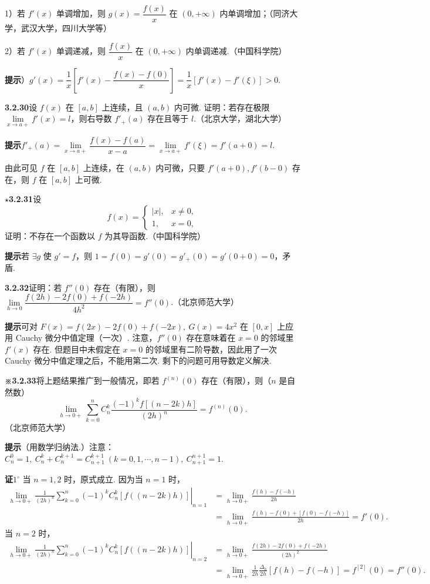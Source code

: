 \documentclass[UTF8,12pt,a4paper,fontset=fandol]{ctexart}
\begin{document}
1）若 $f'(x)$ 单调增加，则 $g(x)=\dfrac{f(x)}x$ 在 $(0,+\infty)$ 内单调增加；（同济大学，武汉大学，四川大学等）

2）若 $f'(x)$ 单调递减，则 $\dfrac{f(x)}x$ 在 $(0,+\infty)$ 内单调递减.（中国科学院）

\noindent\textbf{提示}）$g'(x)=\dfrac1x\left[f'(x)-\dfrac{f(x)-f(0)}x\right]=\dfrac1x[f'(x)-f'(\xi)]>0$.

\noindent\textbf{3.2.30}\quad 设 $f(x)$ 在 $[a,b]$ 上连续，且 $(a,b)$ 内可微. 证明：若存在极限 $\lim\limits_{x\to a+}f'(x)=l$，则右导数 $f'_+(a)$ 存在且等于 $l$.（北京大学，湖北大学）

\noindent\textbf{提示}\quad $f'_+(a)=\lim\limits_{x\to a+}\dfrac{f(x)-f(a)}{x-a}=\lim\limits_{x\to a+}f'(\xi)=f'(a+0)=l$.

由此可见 $f$ 在 $[a,b]$ 上连续，在 $(a,b)$ 内可微，只要 $f'(a+0),f'(b-0)$ 存在，则 $f$ 在 $[a,b]$ 上可微.

\noindent\textbf{$\star$3.2.31}\quad 设
\[
  f(x)=
  \begin{cases}
    |x|,& x\ne0,\\
    1,& x=0,
  \end{cases}
\]
证明：不存在一个函数以 $f$ 为其导函数.（中国科学院）

\noindent\textbf{提示}\quad 若 $\exists g$ 使 $g'=f$，则 $1=f(0)=g'(0)=g'_+(0)=g'(0+0)=0$，矛盾.

\noindent\textbf{3.2.32}\quad 证明：若 $f''(0)$ 存在（有限），则 $\lim\limits_{h\to0}\dfrac{f(2h)-2f(0)+f(-2h)}{4h^2}=f''(0)$.（北京师范大学）

\noindent\textbf{提示}\quad 可对 $F(x)=f(2x)-2f(0)+f(-2x),\ G(x)=4x^2$ 在 $[0,x]$ 上应用 Cauchy 微分中值定理（一次）. 注意，$f''(0)$ 存在意味着在 $x=0$ 的邻域里 $f'(x)$ 存在. 但题目中未假定在 $x=0$ 的邻域里有二阶导数，因此用了一次 Cauchy 微分中值定理之后，不能用第二次. 剩下的问题可用导数定义解决.

\noindent\textbf{※3.2.33}\quad 将上题结果推广到一般情况，即若 $f^{(n)}(0)$ 存在（有限），则（$n$ 是自然数）
\[
  \lim_{h\to0+}\sum_{k=0}^n C_n^k\frac{(-1)^k f[(n-2k)h]}{(2h)^n}=f^{(n)}(0).
\]
（北京师范大学）

\noindent\textbf{提示}\quad （用数学归纳法.）注意：$C_n^0=1,\ C_n^k+C_n^{k+1}=C_{n+1}^{k+1}\ (k=0,1,\cdots,n-1),\ C_{n+1}^{n+1}=1$.

\noindent\textbf{证}\quad $1^\circ$ 当 $n=1,2$ 时，原式成立. 因为当 $n=1$ 时，
\[
\begin{aligned}
\left.\lim_{h\to0+}\frac1{(2h)^n}\sum_{k=0}^n(-1)^kC_n^k[f((n-2k)h)]\right|_{n=1}
&=\lim_{h\to0+}\frac{f(h)-f(-h)}{2h}\\
&=\lim_{h\to0+}\frac{f(h)-f(0)+[f(0)-f(-h)]}{2h}
=f'(0).
\end{aligned}
\]
当 $n=2$ 时，
\[
\begin{aligned}
\left.\lim_{h\to0+}\frac1{(2h)^n}\sum_{k=0}^n(-1)^kC_n^k[f((n-2k)h)]\right|_{n=2}
&=\lim_{h\to0+}\frac{f(2h)-2f(0)+f(-2h)}{(2h)^2}\\
&=\lim_{h\to0+}\frac1{2h}\frac{\Delta_h}{2h}[f(h)-f(-h)]
=f^{[2]}(0)=f''(0).
\end{aligned}
\]
\end{document}
